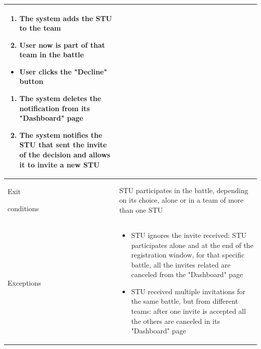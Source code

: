 \begin{center}
\begin{tabular}{| m{2cm} | m{10cm}|}
\begin{enumerate}
                                        \begin{enumerate}
                                            \item The system adds the STU to the team
                                            \item User now is part of that team in the battle
                                        \end{enumerate}
                                    \begin{itemize}
                                        \item User clicks the "Decline" button
                                    \end{itemize}
                                        \begin{enumerate}
                                            \item The system deletes the notification from its "Dashboard" page
                                            \item The system notifies the STU that sent the invite of the decision and allows it to invite a new STU
                                        \end{enumerate}
                                \end{enumerate}                                                                                                                                                                                                                                                                                     \\ \hline
        Exit \par conditions  & STU participates in the battle, depending on its choice, alone or in a team of more than one STU                                                                                                                                                                                                    \\ \hline
        Exceptions            & \begin{itemize}
                                    \item STU ignores the invite received: STU participates alone and at the end of the registration window, for that specific battle, all the invites related are canceled from the "Dashboard" page
                                    \item STU received multiple invitations for the same battle, but from different teams: after one invite is accepted all the others are canceled in its "Dashboard" page

\end{itemize}
\end{tabular}
\end{center}
